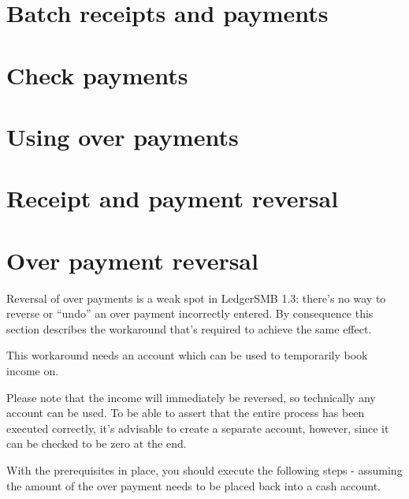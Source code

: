 \section{Batch receipts and payments}
\label{sec-business-processes-payment-processing-batch-payments}

\section{Check payments}
\label{sec-business-processes-payment-processing-check-payments}


\section{Using over payments}
\label{sec-business-processes-payment-processing-overpayments}

\section{Receipt and payment reversal}
\label{sec-business-processes-payment-processing-reversal}

\section{Over payment reversal}
\label{sec-business-processes-payment-processing-overpayment-reversal}

Reversal of over payments is a weak spot in LedgerSMB 1.3: there's no way
to reverse or ``undo'' an over payment incorrectly entered.  By consequence
this section describes the workaround that's required to achieve the same
effect.

This workaround needs an account which can be used to temporarily book income on.

Please note that the income will immediately be reversed, so
technically any account can be used.  To be able to assert that the entire process
has been executed correctly, it's advisable to create a separate account, however, since
it can be checked to be zero at the end.

With the prerequisites in place, you should execute the following steps - assuming the amount
of the over payment needs to be placed back into a cash account.

